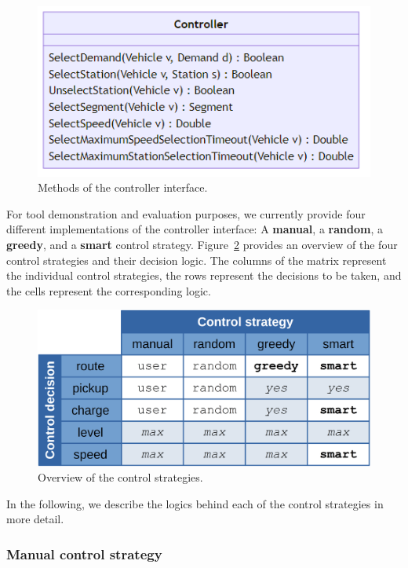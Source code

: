 \documentclass[a4paper,twoside]{article}
\begin{document}
	\begin{figure}[!ht]
		\centering
		\includegraphics[scale=0.4]{../../diagrams/controller/classes-minimal.png}
		\caption{Methods of the controller interface.}
		\label{fig:controller-interface}
	\end{figure}
	
	For tool demonstration and evaluation purposes, we currently provide four different implementations of the controller interface: A \textbf{manual}, a \textbf{random}, a \textbf{greedy}, and a \textbf{smart} control strategy.
	Figure~\ref{fig:control-strategies} provides an overview of the four control strategies and their decision logic.
	The columns of the matrix represent the individual control strategies, the rows represent the decisions to be taken, and the cells represent the corresponding logic.
	
	\begin{figure}[!ht]
		\centering
		\includegraphics[width=0.8\columnwidth]{control_strategy_overview.png}
		\caption{Overview of the control strategies.}
		\label{fig:control-strategies}
	\end{figure}
	
	In the following, we describe the logics behind each of the control strategies in more detail.
	
	\subsubsection*{Manual control strategy}
	\label{sec:controller-manual}
	
\end{document}
